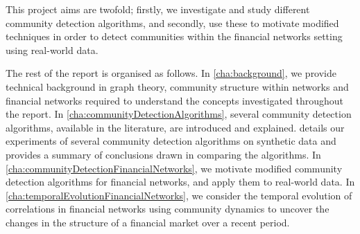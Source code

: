 This project aims are twofold; firstly, we investigate and study different community detection algorithms, and secondly, use these to motivate modified techniques in order to detect communities within the financial networks setting using real-world data.

The rest of the report is organised as follows.
In \cref{cha:background}, we provide technical background in graph theory, community structure within networks and financial networks required to understand the concepts investigated throughout the report.
In \cref{cha:communityDetectionAlgorithms}, several community detection algorithms, available in the literature, are introduced and explained.
 details our experiments of several community detection algorithms on synthetic data and provides a summary of conclusions drawn in comparing the algorithms.
In \cref{cha:communityDetectionFinancialNetworks}, we motivate modified community detection algorithms for financial networks, and apply them to real-world data.
In \cref{cha:temporalEvolutionFinancialNetworks}, we consider the temporal evolution of correlations in financial networks using community dynamics to uncover the changes in the structure of a financial market over a recent period.